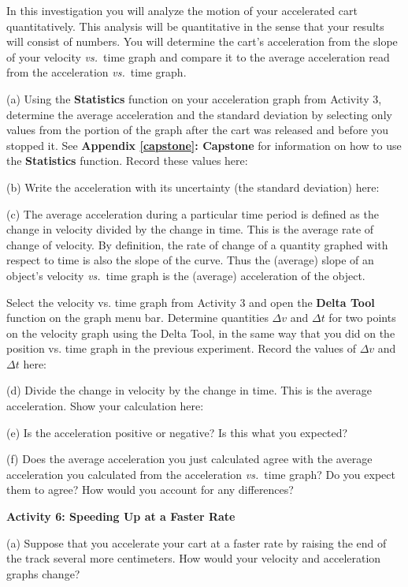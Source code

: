 In this investigation you will analyze the motion of your accelerated cart quantitatively.
This analysis will be quantitative in the sense that your results will consist
of numbers. You will determine the cart's acceleration from the slope of your
velocity \textit{vs.}~time graph and compare it to the average acceleration read from
the acceleration \textit{vs.}~time graph. 

(a) Using the \textbf{Statistics} function on your acceleration graph from Activity 3, determine the average acceleration and the standard deviation by selecting only values from the portion of the graph after the cart was released and before you stopped it. See \textbf{Appendix \ref{capstone}: Capstone} for information on how to use the \textbf{Statistics} function. Record these values here:
\answerspace{20mm}

(b) Write the acceleration with its uncertainty (the standard deviation) here:
\answerspace{20mm}

(c) The average acceleration during a particular time period is defined as the
change in velocity divided by the change in time. This is the average rate of
change of velocity. By definition, the rate of change of a quantity graphed
with respect to time is also the slope of the curve. Thus the (average) slope
of an object's velocity \textit{vs.}~time graph is the (average) acceleration of the
object.

Select the velocity vs. time graph from Activity 3 and open the \textbf{Delta Tool} function on the graph menu bar. Determine quantities \( \Delta v\) and \( \Delta t\) for two points on the velocity graph using the Delta Tool, 
in the same way that you did on the position vs. time graph in the previous experiment. Record the values of 
\( \Delta v\) and \( \Delta t\) here:
\answerspace{20mm}

(d) Divide the change in velocity by the change in time. This is the average acceleration. Show your calculation here:
\answerspace{20mm}

\pagebreak[2]
(e) Is the acceleration positive or negative? Is this what you expected? 
\answerspace{15mm}

(f) Does the average acceleration you just calculated agree with the average
acceleration you calculated from the acceleration \textit{vs.}~time graph? Do you expect them to agree? How would you account for any differences? 
\answerspace{20mm}

\textbf{Activity 6: Speeding Up at a Faster Rate} 

(a) Suppose that you accelerate your cart at a faster rate by raising the end of the track several more centimeters. How would your velocity and acceleration graphs change? 
\answerspace{15mm}

